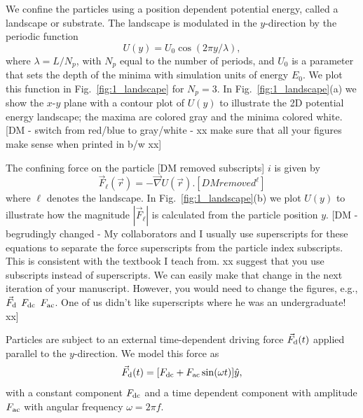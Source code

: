 \documentclass[preprint,showpacs,preprintnumbers,amsmath,amssymb,aps,prb]{revtex4-1}
\theoremstyle{remark}
\begin{document}
We confine the particles using a position dependent 
potential energy, called a landscape or substrate.
The landscape is modulated in the $y$-direction
by the periodic function 
 \begin{equation}
   U(y) = U_0 \cos{(2 \pi y / \lambda)},
     \label{eq:ysubstrate}
\end{equation}
where $\lambda=L/N_p$, with $N_p$ equal to the number of periods,
and $U_0$ is a parameter
 that sets the depth of the minima
 with simulation units of energy $E_0$. 
 We plot this function in 
 Fig.~\ref{fig:1_landscape}
 for $N_p = 3$.  In Fig.~\ref{fig:1_landscape}(a) we show 
 the $x$-$y$ plane with a contour plot of $U(y)$ 
 to illustrate
 the 2D potential energy landscape;
 the maxima are colored gray and the minima colored white.
 [DM - switch from red/blue to gray/white - xx make sure that all your figures make sense when printed in b/w xx]

The confining force on the particle [DM removed subscripts] $i$
 is given by
 \begin{equation}
 \vec{F}_{\ell}(\vec{r}) = - \vec \nabla U(\vec{r}). [DM removed ^{\ell}]
 \label{eq:dudr}
 \end{equation}
 where $\ell$ denotes the landscape.
 In Fig.~\ref{fig:1_landscape}(b) we plot  
 $U(y)$ to illustrate how the magnitude
 $|\vec{F}_{\ell}|$ is calculated from the particle position $y$.
 [DM - begrudingly changed - My collaborators and I usually use superscripts for these equations to separate the force superscripts from the particle index subscripts.  This is consistent with the textbook I teach from.  xx suggest that you use subscripts instead of superscripts. We can easily make that change in the next iteration of your manuscript. However, you would need to change the figures, e.g., $\vec{F}_{\rm d}$ $F_{\rm dc}$ $F_{\rm ac}$. One of us didn't like superscripts where he was an undergraduate!  xx]
 
Particles are subject to an external time-dependent driving force
$\vec{F}_{\rm d}(t)$
applied parallel to the $y$-direction.
We model this force as
\begin{equation}
  \vec{F}_{\rm d}(t) = [F_{\rm dc} + F_{\rm ac} \sin(\omega t)] \hat{y},
    \label{eq:drive}
\end{equation}
with 
a constant component $F_{\rm dc}$
and a time dependent component with amplitude $F_{\rm ac}$
with angular frequency $\omega = 2 \pi f$.
\end{document}

